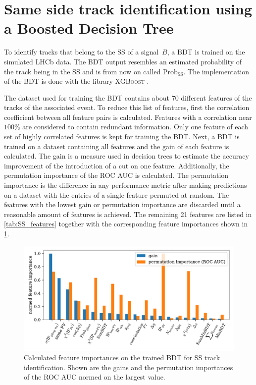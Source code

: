 \section{Same side track identification using a Boosted Decision Tree}
\label{sec:SS_classifier}

To identify tracks that belong to the SS of a signal~$B$, a BDT is trained on the simulated LHCb data. 
The BDT output resembles an estimated probability of the track being in the SS and is from now on called $\text{Prob}_\text{SS}$.
The implementation of the BDT is done with the library \textsc{XGBoost} \cite{xgboost}.

The dataset used for training the BDT contains about 70 different features of the tracks of the associated event.
To reduce this list of features, first the correlation coefficient between all feature pairs is calculated.
Features with a correlation near $100\%$ are considered to contain redundant information.
Only one feature of each set of highly correlated features is kept for training the BDT.
Next, a BDT is trained on a dataset containing all features and the gain of each feature is calculated.
The gain is a measure used in decision trees to estimate the accuracy improvement of the introduction of a cut on one feature.
Additionally, the permutation importance of the ROC AUC is calculated.
The permutation importance is the difference in any performance metric after making predictions on a dataset with the entries of a single feature permuted at random.
The features with the lowest gain or permutation importance are discarded until a reasonable amount of features is achieved.
The remaining 21 features are listed in \cref{tab:SS_features} together with the corresponding feature importances shown in \cref{fig:SS_importances}.

\begin{figure}
    \centering
    \includegraphics[width=\textwidth]{images/SS_feature_importances.pdf}
    \caption{Calculated feature importances on the trained BDT for SS track identification. Shown are the gains and the permutation importances of the ROC AUC normed on the largest value.}
    \label{fig:SS_importances}
\end{figure}

